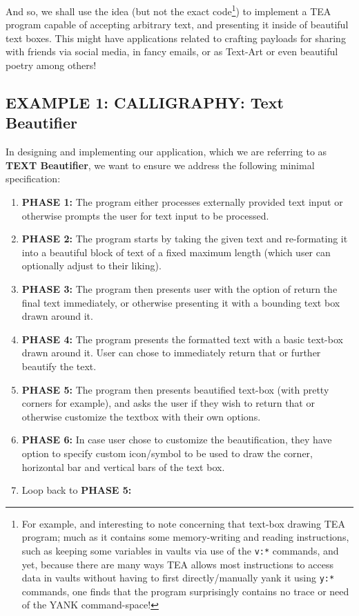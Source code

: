 \documentclass[a4paper, 18pt]{book} %
\begin{document}
{{{And so, we shall use the idea (but not the exact code\footnote{For example, and interesting to note concerning that text-box drawing TEA program; much as it contains some memory-writing and reading instructions, such as keeping some variables in vaults via use of the \texttt{v:*} commands, and yet, because there are many ways TEA allows most instructions to access data in vaults without having to first directly/manually yank it using \texttt{y:*} commands, one finds that the program surprisingly contains no trace or need of the YANK command-space!}) to implement a TEA program capable of accepting arbitrary text, and presenting it inside of beautiful text boxes. This might have applications related to crafting payloads for sharing with friends via social media, in fancy emails, or as Text-Art or even beautiful poetry among others!


\subsection{EXAMPLE 1: \textbf{CALLIGRAPHY:} Text Beautifier}
\label{SECYEXAMP1}


In designing and implementing our application, which we are referring to as \textbf{TEXT Beautifier}, we want to ensure we address the following minimal specification:

\vspace{2em}

\begin{enumerate}
\item \textbf{PHASE 1:} The program either processes externally provided text input or otherwise prompts the user for text input to be processed.
\item \textbf{PHASE 2:} The program starts by taking the given text and re-formating it into a beautiful block of text of a fixed maximum length (which user can optionally adjust to their liking).
\item \textbf{PHASE 3:} The program then presents user with the option of return the final text immediately, or otherwise presenting it with a bounding text box drawn around it.
\item \textbf{PHASE 4:} The program presents the formatted text with a basic text-box drawn around it. User can chose to immediately return that or further beautify the text.
\item \textbf{PHASE 5:} The program then presents beautified text-box (with pretty corners for example), and asks the user if they wish to return that or otherwise customize the textbox with their own options.
\item \textbf{PHASE 6:} In case user chose to customize the beautification, they have option to specify custom icon/symbol to be used to draw the corner, horizontal bar and vertical bars of the text box.
\item Loop back to \textbf{PHASE 5:}   
\end{enumerate}

}}}
\end{document}
